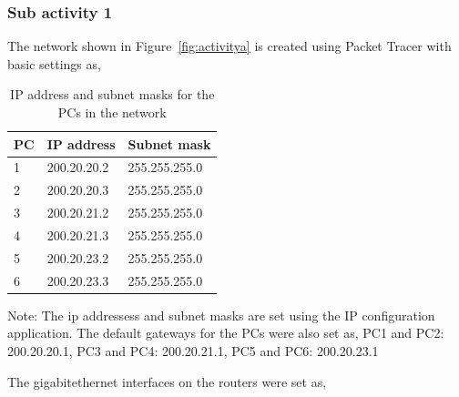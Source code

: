 \documentclass{lab_sheet}
\newcommand{\setting}[2]{
    \begin{tabular}{C{3cm}C{5cm}C{5cm}}
        \toprule
          #1 & IP address & Subnet mask\\
          \midrule
          #2
          \bottomrule
       \end{tabular}
}
\begin{document}
    \subsubsection*{Sub activity 1}
    The network shown in Figure~\ref{fig:activitya} is created using Packet Tracer with basic settings as,
    \begin{table}[H]
        \centering
        \begin{threeparttable}
        \setting{PC}{
        1 & 200.20.20.2  & 255.255.255.0 \\
        2 & 200.20.20.3  & 255.255.255.0 \\
        3 & 200.20.21.2  & 255.255.255.0 \\
        4 & 200.20.21.3  & 255.255.255.0 \\
        5 & 200.20.23.2  & 255.255.255.0 \\
        6 & 200.20.23.3  & 255.255.255.0 \\
        }
  \begin{tablenotes}
    \small
    \item Note: The ip addressess and subnet masks are set using the IP configuration application. The default gateways for the PCs were also set as, PC1 and PC2: 200.20.20.1, PC3 and PC4: 200.20.21.1, PC5 and PC6: 200.20.23.1
  \end{tablenotes}
  \caption{IP address and subnet masks for the PCs in the network}
  \label{tbl:pcsettinga}
        \end{threeparttable}
    \end{table}
    The gigabitethernet interfaces on the routers were set as,
\end{document}
